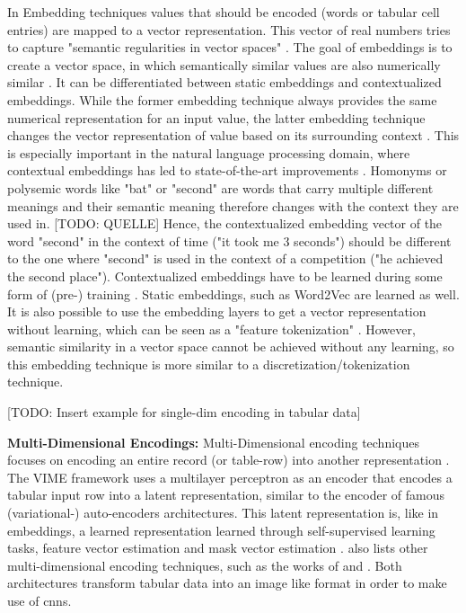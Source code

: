 In Embedding techniques values that should be encoded (\eg words or tabular cell entries) are mapped to a vector representation. 
This vector of real numbers tries to capture "semantic regularities in vector spaces" \cite[p. 2]{pilaluisa2022ContextualWordEmbeddings}.
The goal of embeddings is to create a vector space, in which semantically similar values are also numerically similar \cite{pilaluisa2022ContextualWordEmbeddings}.
It can be differentiated between static embeddings and contextualized embeddings. 
While the former embedding technique always provides the same numerical representation for an input value, the latter embedding technique changes the vector representation of value based on its surrounding context \cite{pilaluisa2022ContextualWordEmbeddings}.
This is especially important in the natural language processing domain, where contextual embeddings has led to state-of-the-art improvements \cite{pilaluisa2022ContextualWordEmbeddings}.
Homonyms or polysemic words like "bat" or "second" are words that carry multiple different meanings and their semantic meaning therefore changes with the context they are used in. [TODO: QUELLE]
Hence, the contextualized embedding vector of the word "second" in the context of time (\eg "it took me 3 seconds") should be different to the one where "second" is used in the context of a competition (\eg "he achieved the second place").
Contextualized embeddings have to be learned during some form of (pre-) training \cite{devlin2019BERTPretrainingDeep, iida2021TABBIEPretrainedRepresentations, deng2021TURLTableUnderstanding}. 
Static embeddings, such as Word2Vec \cite{mikolov2013DistributedRepresentationsWords} are learned as well. 
It is also possible to use the embedding layers to get a vector representation without learning, which can be seen as a "feature tokenization" \cite{zheng2022DiffusionModelsMissing, gorishniy2021RevisitingDeepLearning}.
However, semantic similarity in a vector space cannot be achieved without any learning, so this embedding technique is more similar to a discretization/tokenization technique.

[TODO: Insert example for single-dim encoding in tabular data]

\textbf{Multi-Dimensional Encodings:}
Multi-Dimensional encoding techniques focuses on encoding an entire record (or table-row) into another representation \cite{borisov2022DeepNeuralNetworks}.
The VIME framework \cite{yoon2020VIMEExtendingSuccess} uses a multilayer perceptron as an encoder that encodes a tabular input row into a latent representation, 
similar to the encoder of famous (variational-) auto-encoders \cite{kingma2013AutoEncodingVariationalBayes} architectures.
This latent representation is, like in embeddings, a learned representation learned through self-supervised learning tasks, feature vector estimation and mask vector estimation \cite{yoon2020VIMEExtendingSuccess}.
\cite{borisov2022DeepNeuralNetworks} also lists other multi-dimensional encoding techniques, such as the works of \cite{zhu2021ConvertingTabularData} and \cite{sun2019supertml}.
Both architectures transform tabular data into an image like format in order to make use of \glspl{cnn}.


